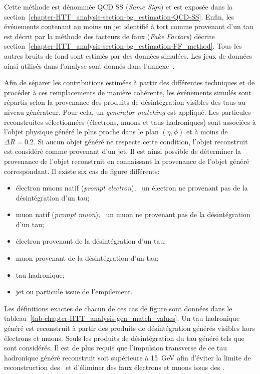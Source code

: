 Cette méthode est dénommée \og QCD SS \fg{} (\emph{Same Sign}) et est exposée dans la section~\ref{chapter-HTT_analysis-section-bg_estimation-QCD-SS}.
Enfin, les événements contenant au moins un jet identifié à tort comme provenant d'un tau est décrit par la méthode des facteurs de faux (\emph{Fake Factors}) décrite section~\ref{chapter-HTT_analysis-section-bg_estimation-FF_method}.
Tous les autres bruits de fond sont estimés par des données simulées.
Les jeux de données ainsi utilisés dans l'analyse sont donnés dans l'annexe~.
\par
Afin de séparer les contributions estimées à partir des différentes techniques et de procéder à ces remplacements de manière cohérente, les événements simulés sont répartis selon la provenance des produits de désintégration visibles des taus au niveau générateur.
Pour cela, un \emph{generator matching} est appliqué.
Les particules reconstruites sélectionnées (électrons, muons et taus hadroniques) sont associées à l'objet physique généré le plus proche dans le plan $(\eta, \phi)$ et à moins de $\Delta R = \num{0.2}$.
Si aucun objet généré ne respecte cette condition, l'objet reconstruit est considéré comme provenant d'un jet.
Il est ainsi possible de déterminer la provenance de l'objet reconstruit en connaissant la provenance de l'objet généré correspondant.
Il existe six cas de figure différents:
\begin{itemize}
\item électron muons natif (\emph{prompt electron}), \ie\ un électron ne provenant pas de la désintégration d'un tau;
\item muon natif (\emph{prompt muon}), \ie\ un muon ne provenant pas de la désintégration d'un tau;
\item électron provenant de la désintégration d'un tau;
\item muon provenant de la désintégration d'un tau;
\item tau hadronique;
\item jet ou particule issue de l'empilement.
\end{itemize}
Les définitions exactes de chacun de ces cas de figure sont données dans le tableau~\ref{tab-chapter-HTT_analysis-gen_match_values}.
Un tau hadronique généré est reconstruit à partir des produits de désintégration générés visibles hors électrons et muons.
Seuls les produits de désintégration du tau généré tels que  sont considérés.
Il est de plus requis que l'impulsion transverse de ce tau hadronique généré reconstruit soit supérieure à \SI{15}{\GeV} afin d'éviter la limite de reconstruction des \tauh\ et d'éliminer des faux électrons et muons issus des \tauh.
